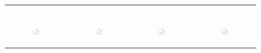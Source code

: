 \begin{figure}[ht]
\begin{tabular}{cccc}
\begin{subfigure}[b]{0.22\textwidth}
			\caption{}
			\label{appfig:runtime_zigzag_setcover}
	  \end{subfigure} \\
	  \begin{subfigure}[b]{0.22\textwidth}
	  	\includegraphics[width=105pt]{images/speedup_bigsynthetic_maxgraphcut.pdf}
			\caption{}
			\label{appfig:speedup_bigsynthetic_maxgraphcut}
	  \end{subfigure} &
	  \begin{subfigure}[b]{0.22\textwidth}
	  	\includegraphics[width=105pt]{images/speedup_bigsynthetic_setcover.pdf}
			\caption{}
			\label{appfig:speedup_bigsynthetic_setcover}
	  \end{subfigure} &
	  \begin{subfigure}[b]{0.22\textwidth}
	  	\includegraphics[width=105pt]{images/speedup_zigzag_maxgraphcut.pdf}
			\caption{}
			\label{appfig:speedup_zigzag_maxgraphcut}
	  \end{subfigure} &
	  \begin{subfigure}[b]{0.22\textwidth}
	  	\includegraphics[width=105pt]{images/speedup_zigzag_setcover.pdf}
			\caption{}
			\label{appfig:speedup_zigzag_setcover}

\end{subfigure}
\end{tabular}
\end{figure}
